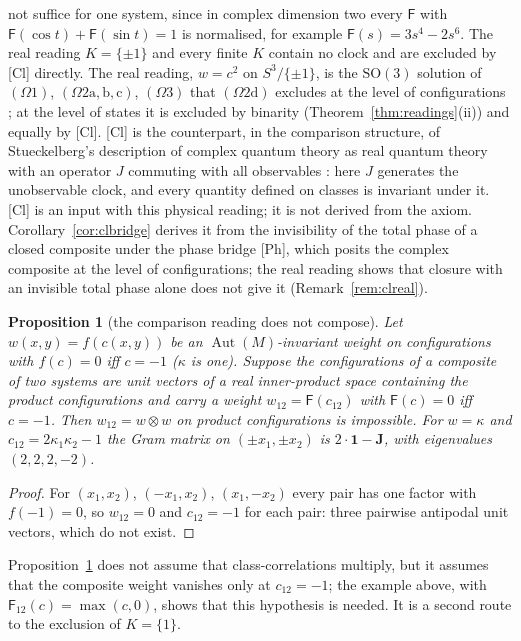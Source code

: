 \documentclass[aps,pra,onecolumn,superscriptaddress,nofootinbib,10pt]{revtex4-2}
\newtheorem{proposition}[theorem]{Proposition}
\theoremstyle{definition}
\theoremstyle{remark}
\newcommand{\Aut}{\operatorname{Aut}}
\newcommand{\SO}{\mathrm{SO}}
\begin{document}
not suffice for one system, since in complex dimension two every $\mathsf F$ with $\mathsf F(\cos t)+\mathsf F(\sin t)=1$
is normalised, for example $\mathsf F(s)=3s^4-2s^6$.  The real reading $K=\{\pm1\}$ and every finite $K$ contain no clock and are excluded by [Cl]
directly.  The real reading, $w=c^2$ on $S^3/\{\pm1\}$, is the $\SO(3)$ solution of $(\Omega1)$, $(\Omega2\mathrm{a,b,c})$,
$(\Omega3)$ that $(\Omega2\mathrm d)$ excludes at the level of configurations \cite[Rem.~3.13]{PaperI}; at the level of
states it is excluded by binarity (Theorem~\ref{thm:readings}(ii)) and equally by [Cl].  [Cl] is the counterpart, in the comparison structure, of Stueckelberg's description of complex
quantum theory as real quantum theory with an operator $J$ commuting with all observables
\cite{Stueckelberg}: here $J$ generates the unobservable clock, and every quantity defined on classes is
invariant under it.  [Cl] is an input with this physical reading; it is not derived from the axiom.
Corollary~\ref{cor:clbridge} derives it from the invisibility of the total phase of a closed composite under the
phase bridge [Ph], which posits the complex composite at the level of configurations; the real reading
shows that closure with an invisible total phase alone does not give it (Remark~\ref{rem:clreal}).

\begin{proposition}[the comparison reading does not compose]\label{prop:nogo}
Let $w(x,y)=f(c(x,y))$ be an $\Aut(M)$-invariant weight on configurations with $f(c)=0$ iff $c=-1$ ($\kappa$ is
one).  Suppose the configurations of a composite of two systems are unit vectors of a real
inner-product space containing the product configurations and carry a weight $w_{12}=\mathsf F(c_{12})$ with
$\mathsf F(c)=0$ iff $c=-1$.  Then $w_{12}=w\otimes w$ on product configurations is impossible.  For $w=\kappa$ and
$c_{12}=2\kappa_1\kappa_2-1$ the Gram matrix on $(\pm x_1,\pm x_2)$ is $2\cdot\mathbf1-\mathbf J$, with eigenvalues
$(2,2,2,-2)$.
\end{proposition}
\begin{proof}
For $(x_1,x_2)$, $(-x_1,x_2)$, $(x_1,-x_2)$ every pair has one factor with $f(-1)=0$, so $w_{12}=0$ and
$c_{12}=-1$ for each pair: three pairwise antipodal unit vectors, which do not exist.
\end{proof}
Proposition~\ref{prop:nogo} does not assume that class-correlations multiply, but it assumes that the
composite weight vanishes only at $c_{12}=-1$; the example above, with $\mathsf F_{12}(c)=\max(c,0)$, shows that this
hypothesis is needed.  It is a second route to
the exclusion of $K=\{1\}$.
\end{document}
